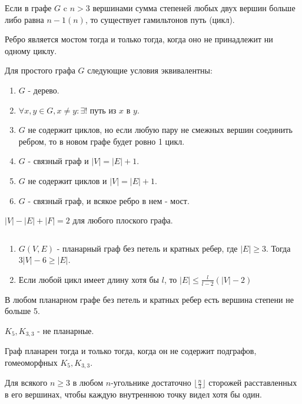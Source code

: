 \documentclass[12pt]{article}
\begin{document}
\begin{thm}[Дирак, 1952]
    Если в графе $G$ c $n > 3$ вершинами сумма степеней любых двух вершин больше либо равна $n-1 (n)$, то существует гамильтонов путь (цикл).
\end{thm}
\begin{thm}[о мостах]
    Ребро является мостом тогда и только тогда, когда оно не принадлежит ни одному циклу.
\end{thm}
\begin{thm}[о деревьях]
    Для простого графа $G$ следующие условия эквивалентны:
    \begin{enumerate}
	\item $G$ - дерево.
	\item $\forall x, y \in G, x \ne y: \exists! \mbox{ путь из } x \mbox{ в }y$.
	\item $G$ не содержит циклов, но если любую пару не смежных вершин соединить ребром, то в новом графе будет ровно 1 цикл.
	\item $G$ - связный граф и $|V| = |E| + 1$.
	\item $G$ не содержит циклов и $|V| = |E| + 1$.
	\item $G$ - связный граф, и всякое ребро в нем - мост.
    \end{enumerate}
\end{thm}
\begin{thm}
    $|V| - |E| + |F| = 2$ для любого плоского графа.
\end{thm}
\begin{thm}$ $
    \begin{enumerate}
	\item $G(V, E)$ - планарный граф без петель и кратных ребер, где $|E| \ge 3$. Тогда $3 |V|-6 \ge |E| $.
	\item Если любой цикл имеет длину хотя бы $l$, то $|E| \le \frac{l}{l-2}(|V|-2)$
    \end{enumerate}
\end{thm}
\begin{st}
    В любом планарном графе без петель и кратных ребер есть вершина степени не больше 5.
\end{st}
\begin{lm}
    $K_5, K_{3,3}$ - не планарные.
\end{lm}
\begin{thm}
    Граф планарен тогда и только тогда, когда он не содержит подграфов, гомеоморфных $K_5, K_{3,3}$.
\end{thm}
\begin{thm}
    Для всякого $n \ge 3$ в любом $n$-угольнике достаточно $\lfloor \frac{n}{3} \rfloor$ сторожей расставленных в его вершинах, чтобы каждую внутреннюю точку видел хотя бы один.
\end{thm}
\end{document}
